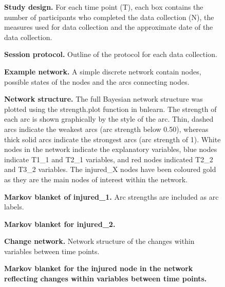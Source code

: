 \documentclass[
]{frontiersHLTH}
\begin{document}
\begin{figure}[!h]
\caption{{\bf Study design.}
For each time point (T), each box contains the number of participants who completed the data collection (N), the measures used for data collection and the approximate date of the data collection.}
\label{fig:fig3}
\end{figure}

\begin{figure}[!h]
\caption{{\bf Session protocol.}
Outline of the protocol for each data collection.}
\label{fig:fig4}
\end{figure}

\begin{figure}[H]
\caption{{\bf Example network.}
A simple discrete network contain nodes, possible states of the nodes and the arcs connecting nodes.}
\label{fig:fig5}
\end{figure}

\begin{figure}[H]
\caption{{\bf Network structure.}
The full Bayesian network structure was plotted using the strength.plot function in bnlearn. The strength of each arc is shown graphically by the style of the arc. Thin, dashed arcs indicate the weakest arcs (arc strength below 0.50), whereas thick solid arcs indicate the strongest arcs (arc strength of 1). White nodes in the network indicate the explanatory variables, blue nodes indicate T1\_1 and T2\_1 variables, and red nodes indicated T2\_2 and T3\_2 variables. The injured\_X nodes have been coloured gold as they are the main nodes of interest within the network.}
\label{fig:fig6}
\end{figure}

\begin{figure}[H]
\caption{{\bf Markov blanket of injured\_1.}
Arc strengths are included as arc labels.}
\label{fig:fig7}
\end{figure}

\begin{figure}[H]
\caption{{\bf Markov blanket for injured\_2.} }
\label{fig:fig8}
\end{figure}

\begin{figure}[H]
\caption{{\bf Change network.}
Network structure of the changes within variables between time points.}
\label{fig:fig9}
\end{figure}

\begin{figure}[H]
\caption{{\bf Markov blanket for the injured node in the network reflecting changes within variables between time points.}}
\label{fig:fig10}
\end{figure}
\end{document}
